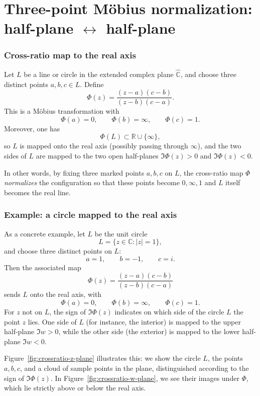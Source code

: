 \documentclass[12pt,a4paper]{article}
\begin{document}
	
	\section*{Three-point M\"obius normalization: half-plane $\leftrightarrow$ half-plane}
	
	\subsubsection*{Cross-ratio map to the real axis}
	
	Let $L$ be a line or circle in the extended complex plane $\widehat{\mathbb C}$,
	and choose three distinct points $a,b,c\in L$. Define
	\[
	\Phi(z)
	= \frac{(z-a)(c-b)}{(z-b)(c-a)}.
	\]
	This is a M\"obius transformation with
	\[
	\Phi(a) = 0,\qquad
	\Phi(b) = \infty,\qquad
	\Phi(c) = 1.
	\]
	Moreover, one has
	\[
	\Phi(L) \subset \mathbb R \cup \{\infty\},
	\]
	so $L$ is mapped onto the real axis (possibly passing through $\infty$),
	and the two sides of $L$ are mapped to the two open half-planes
	$\Im \Phi(z) > 0$ and $\Im \Phi(z) < 0$.
	
	In other words, by fixing three marked points $a,b,c$ on $L$, the
	cross-ratio map $\Phi$ \emph{normalizes} the configuration so that these
	points become $0,\infty,1$ and $L$ itself becomes the real line.
	
	\subsubsection*{Example: a circle mapped to the real axis}
	
	As a concrete example, let $L$ be the unit circle
	\[
	L = \{ z\in\mathbb C : |z|=1 \},
	\]
	and choose three distinct points on $L$:
	\[
	a = 1,\qquad b=-1,\qquad c=i.
	\]
	Then the associated map
	\[
	\Phi(z) = \frac{(z-a)(c-b)}{(z-b)(c-a)}
	\]
	sends $L$ onto the real axis, with
	\[
	\Phi(a)=0,\qquad \Phi(b)=\infty,\qquad \Phi(c)=1.
	\]
	For $z$ not on $L$, the sign of $\Im \Phi(z)$ indicates on which side of
	the circle $L$ the point $z$ lies. One side of $L$ (for instance, the
	interior) is mapped to the upper half-plane $\Im w>0$, while the other
	side (the exterior) is mapped to the lower half-plane $\Im w<0$.
	
	Figure~\ref{fig:crossratio-z-plane} illustrates this: we show the circle
	$L$, the points $a,b,c$, and a cloud of sample points in the plane,
	distinguished according to the sign of $\Im\Phi(z)$. In
	Figure~\ref{fig:crossratio-w-plane}, we see their images under $\Phi$,
	which lie strictly above or below the real axis.
	
\end{document}
